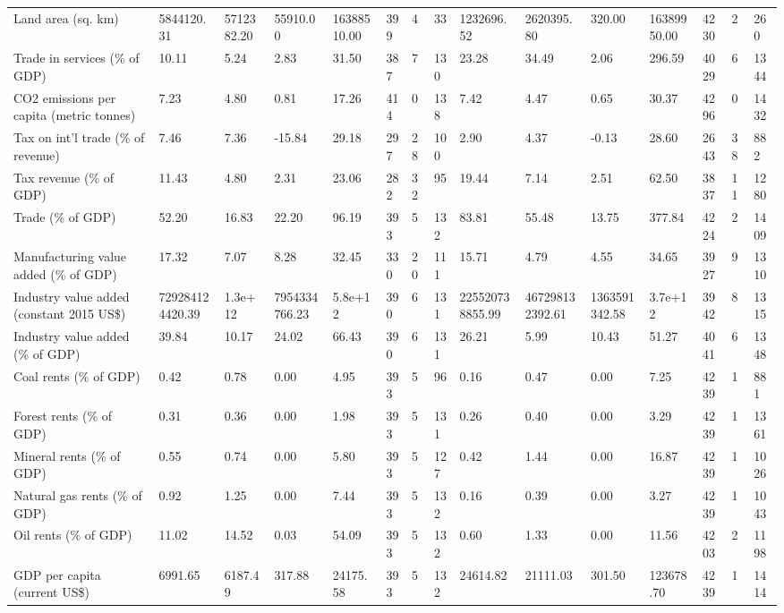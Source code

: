 \begin{longtable}{lllllllllllllll}
Land area (sq. km) & 5844120.31 & 5712382.20 & 55910.00 & 16388510.00 & 399 & 4 & 33 & 1232696.52 & 2620395.80 & 320.00 & 16389950.00 & 4230 & 2 & 260\\
Trade in services (\% of GDP) & 10.11 & 5.24 & 2.83 & 31.50 & 387 & 7 & 130 & 23.28 & 34.49 & 2.06 & 296.59 & 4029 & 6 & 1344\\
\addlinespace
CO2 emissions per capita (metric tonnes) & 7.23 & 4.80 & 0.81 & 17.26 & 414 & 0 & 138 & 7.42 & 4.47 & 0.65 & 30.37 & 4296 & 0 & 1432\\
Tax on int'l trade (\% of revenue) & 7.46 & 7.36 & -15.84 & 29.18 & 297 & 28 & 100 & 2.90 & 4.37 & -0.13 & 28.60 & 2643 & 38 & 882\\
Tax revenue (\% of GDP) & 11.43 & 4.80 & 2.31 & 23.06 & 282 & 32 & 95 & 19.44 & 7.14 & 2.51 & 62.50 & 3837 & 11 & 1280\\
Trade (\% of GDP) & 52.20 & 16.83 & 22.20 & 96.19 & 393 & 5 & 132 & 83.81 & 55.48 & 13.75 & 377.84 & 4224 & 2 & 1409\\
Manufacturing value added (\% of GDP) & 17.32 & 7.07 & 8.28 & 32.45 & 330 & 20 & 111 & 15.71 & 4.79 & 4.55 & 34.65 & 3927 & 9 & 1310\\
\addlinespace
Industry value added (constant 2015 US\$) & 729284124420.39 & 1.3e+12 & 7954334766.23 & 5.8e+12 & 390 & 6 & 131 & 225520738855.99 & 467298132392.61 & 1363591342.58 & 3.7e+12 & 3942 & 8 & 1315\\
Industry value added (\% of GDP) & 39.84 & 10.17 & 24.02 & 66.43 & 390 & 6 & 131 & 26.21 & 5.99 & 10.43 & 51.27 & 4041 & 6 & 1348\\
Coal rents (\% of GDP) & 0.42 & 0.78 & 0.00 & 4.95 & 393 & 5 & 96 & 0.16 & 0.47 & 0.00 & 7.25 & 4239 & 1 & 881\\
Forest rents (\% of GDP) & 0.31 & 0.36 & 0.00 & 1.98 & 393 & 5 & 131 & 0.26 & 0.40 & 0.00 & 3.29 & 4239 & 1 & 1361\\
Mineral rents (\% of GDP) & 0.55 & 0.74 & 0.00 & 5.80 & 393 & 5 & 127 & 0.42 & 1.44 & 0.00 & 16.87 & 4239 & 1 & 1026\\
\addlinespace
Natural gas rents (\% of GDP) & 0.92 & 1.25 & 0.00 & 7.44 & 393 & 5 & 132 & 0.16 & 0.39 & 0.00 & 3.27 & 4239 & 1 & 1043\\
Oil rents (\% of GDP) & 11.02 & 14.52 & 0.03 & 54.09 & 393 & 5 & 132 & 0.60 & 1.33 & 0.00 & 11.56 & 4203 & 2 & 1198\\
GDP per capita (current US\$) & 6991.65 & 6187.49 & 317.88 & 24175.58 & 393 & 5 & 132 & 24614.82 & 21111.03 & 301.50 & 123678.70 & 4239 & 1 & 1414\\

\end{longtable}
